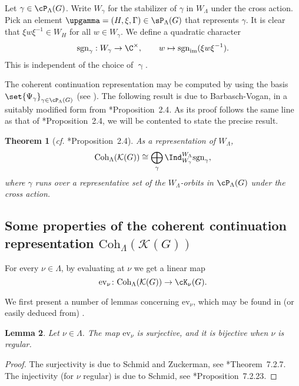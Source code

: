 \documentclass[12pt]{amsart}
\newcommand{\CK}{{\mathcal {K}}}
\numberwithin{equation}{section}
\newtheorem{thm}{Theorem}[section]
\newtheorem{lem}[thm]{Lemma}
\theoremstyle{remark}
\def\cf{\emph{cf.} }
\def\Irr{\mathrm{Irr}}
\def\Coh{\mathrm{Coh}}
\def\ev#1{{\mathrm{ev}_{#1}}}
\newcommand{\Lam}{{[\lambda]}}
\newcommand{\Grt}{\cK}
\begin{document}
Let $\gamma\in \cP_{\Lambda}(G)$. Write $W_{\gamma}$ for the stabilizer of $\gamma$ in $W_{\Lambda}$ under the cross action.
Pick an element $\upgamma=(H, \xi, \Gamma)\in   \sP_{\Lambda}(G)$ that represents $\gamma$.
It is clear that $\xi w \xi^{-1}\in W_H$ for all $w\in W_{\gamma}$. We define a quadratic character
\[
  \mathrm{sgn}_{\gamma}: W_{\gamma}\rightarrow \C^\times, \qquad w\mapsto \mathrm{sgn}_\mathrm{im}(\xi w \xi^{-1}).
\]
This is independent of the choice of $\upgamma$.


The coherent continuation representation may be computed by using the basis  $\set{\Psi_{\gamma}}_{\gamma\in \cP_{\Lambda}(G)}$ (see \cite[Section 14]{V4}).
The following result is due to Barbasch-Vogan, in a suitably modified form from \cite{BV.W}*{Proposition~2.4}. As its proof follows the same line as that of \cite{BV.W}*{Proposition~2.4}, we will be contented to state the precise result.


\begin{thm}[{\cf \cite{BV.W}*{Proposition~2.4}}]
  \label{thm:cohHC}
As a representation of $W_{\Lambda}$,
  \[
    \Coh_{\Lambda}(\CK(G)) \cong \bigoplus_{\gamma}
    \Ind_{W_{\gamma}}^{W_{\Lambda}}  \mathrm{sgn}_{\gamma},
  \]
  where $\gamma$ runs over a representative set of the $W_{\Lambda}$-orbits
  in $\cP_{\Lambda}(G)$ under the cross action.
\end{thm}



\subsection{Some properties of the coherent continuation representation $\Coh_{\Lambda}(\CK(G))$}




For every $\nu\in \Lambda$, by evaluating at $\nu$ we get a linear map
\[
    \ev{\nu} \colon  \Coh_{\Lambda}(\CK(G)) \rightarrow \Grt_{\nu}(G).
\]

We first present a number of lemmas concerning $\ev{\nu}$, %
which may be found in (or easily deduced from) \cite{Vg,V4}.


 \begin{lem}\label{lem21}
Let  $\nu\in \Lambda$. The map  $\ev{\nu}$ is surjective, and it is bijective when $\nu$ is regular.
\end{lem}
\begin{proof}
The surjectivity is due to Schmid and Zuckerman, see  \cite{Vg}*{Theorem~7.2.7}.
The injectivity (for $\nu$ regular)  is due to Schmid, see \cite{Vg}*{Proposition~7.2.23}.
\end{proof}
\end{document}
